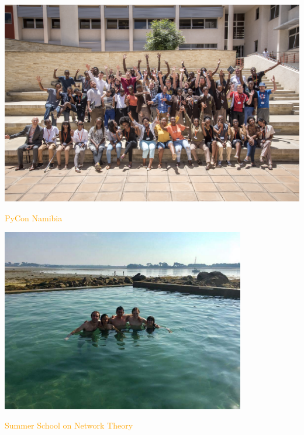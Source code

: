 \documentclass{beamer}
\begin{document}
\begin{frame}
    \begin{center}
        \includegraphics[width=\textwidth]{static/pyconna.jpg}

        \textcolor{orange}{PyCon Namibia}
    \end{center}
\end{frame}

\begin{frame}
    \begin{center}
        \includegraphics[width=0.8\textwidth]{static/france.jpeg}

        \textcolor{orange}{Summer School on Network Theory}
    \end{center}
\end{frame}
\end{document}
